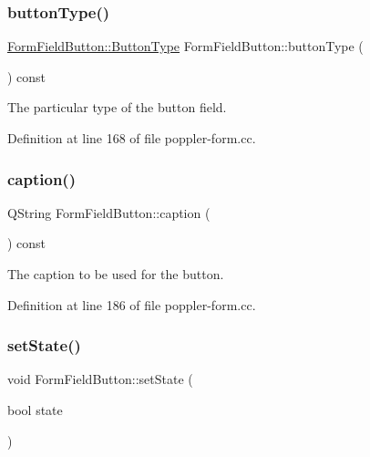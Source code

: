 \subsubsection{\texorpdfstring{button\+Type()}{buttonType()}}
{\footnotesize\ttfamily \hyperlink{class_poppler_1_1_form_field_button_acb50171e446769665a4c671c73385997}{Form\+Field\+Button\+::\+Button\+Type} Form\+Field\+Button\+::button\+Type (\begin{DoxyParamCaption}{ }\end{DoxyParamCaption}) const}

The particular type of the button field. 

Definition at line 168 of file poppler-\/form.\+cc.

\mbox{\label{class_poppler_1_1_form_field_button_a85c53178174c56f6da890ac1ed5896e7}} 
\subsubsection{\texorpdfstring{caption()}{caption()}}
{\footnotesize\ttfamily Q\+String Form\+Field\+Button\+::caption (\begin{DoxyParamCaption}{ }\end{DoxyParamCaption}) const}

The caption to be used for the button. 

Definition at line 186 of file poppler-\/form.\+cc.

\mbox{\label{class_poppler_1_1_form_field_button_a8eabbc4f91bcbec292a07206bbbb2b6e}} 
\subsubsection{\texorpdfstring{set\+State()}{setState()}}
{\footnotesize\ttfamily void Form\+Field\+Button\+::set\+State (\begin{DoxyParamCaption}\item[{bool}]{state }\end{DoxyParamCaption})}

